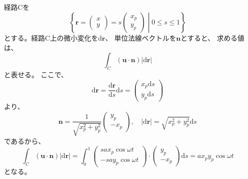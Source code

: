 \documentclass[a4paper]{jsarticle}
\begin{document}
\subsection{}
経路Cを
\begin{equation}
  \left\{
    \boldsymbol{r} =
    \begin{pmatrix}
      x \\ y
    \end{pmatrix} = s
    \begin{pmatrix}
      x_p \\ y_p
    \end{pmatrix}
    \middle|
    0 \leq s \leq 1
  \right\}
\end{equation}
とする。経路C上の微小変化を$\mathrm{d} \boldsymbol{r}$、
単位法線ベクトルを$\boldsymbol{n}$とすると、
求める値は、
\begin{equation}
  \int_C (\boldsymbol{u} \cdot \boldsymbol{n}) |\mathrm{d} \boldsymbol{r}|
\end{equation}
と表せる。
ここで、
\begin{equation}
  \mathrm{d} \boldsymbol{r} =
  \frac{\mathrm{d} \boldsymbol{r}}{\mathrm{d} s} \mathrm{d} s =
  \begin{pmatrix}
    x_p \mathrm{d} s \\ y_p \mathrm{d} s
  \end{pmatrix}
\end{equation}
より、
\begin{equation}
  \boldsymbol{n} =
  \frac{1}{\sqrt{x_p^2 + y_p^2}}
  \begin{pmatrix}
    y_p \\ -x_p
  \end{pmatrix},\quad
  |\mathrm{d} \boldsymbol{r}| =
  \sqrt{x_p^2 + y_p^2} \mathrm{d} s
\end{equation}
であるから、
\begin{equation}
  \int_C (\boldsymbol{u} \cdot \boldsymbol{n}) |\mathrm{d} \boldsymbol{r}|
  = \int_0^1
  \begin{pmatrix}
    s a x_p \cos \omega t \\
    -s a y_p \cos \omega t
  \end{pmatrix} \cdot
  \begin{pmatrix}
    y_p \\ -x_p
  \end{pmatrix} \mathrm{d} s =
  a x_p y_p \cos \omega t
\end{equation}
となる。
\end{document}

